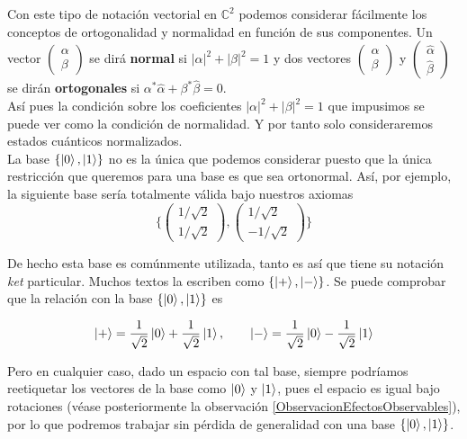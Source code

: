 \documentclass[11pt, spanish]{report}
\numberwithin{equation}{section}
\numberwithin{defin}{section}
\begin{document}
Con este tipo de notación vectorial en $\mathbb{C}^2$ podemos considerar fácilmente los conceptos de ortogonalidad y normalidad en función de sus componentes. Un vector $\begin{pmatrix}\alpha \\ \beta \end{pmatrix}$ se dirá \textbf{normal} si $|\alpha|^2+|\beta|^2=1$ y dos vectores $\begin{pmatrix}\alpha \\ \beta \end{pmatrix}$ y $\begin{pmatrix}\hat{\alpha} \\ \hat{\beta} \end{pmatrix}$ se dirán \textbf{ortogonales} si $\alpha^*\hat{\alpha}+\beta^*\hat{\beta}=0$.\\

Así pues la condición sobre los coeficientes $|\alpha|^2+|\beta|^2=1$ que impusimos se puede ver como la condición de normalidad. Y por tanto solo consideraremos estados cuánticos normalizados.\\

La base $\{\ket{0},\ket{1}\}$ no es la única que podemos considerar puesto que la única restricción que queremos para una base es que sea ortonormal. Así, por ejemplo, la siguiente base sería totalmente válida bajo nuestros axiomas
\begin{equation}
\Bigg\{\begin{pmatrix}1/\sqrt{2} \\ 1/\sqrt{2} \end{pmatrix}, \begin{pmatrix}1/\sqrt{2} \\ -1/\sqrt{2} \end{pmatrix}\Bigg\}
\end{equation}

De hecho esta base es comúnmente utilizada, tanto es así que tiene su notación \textit{ket} particular. Muchos textos la escriben como $\{\ket{+},\ket{-}\}$. Se puede comprobar que la relación con la base $\{\ket{0},\ket{1}\}$ es

\begin{equation}
\ket{+}=\frac{1}{\sqrt{2}}\ket{0}+\frac{1}{\sqrt{2}}\ket{1},\qquad \ket{-}=\frac{1}{\sqrt{2}}\ket{0}-\frac{1}{\sqrt{2}}\ket{1}
\end{equation}

Pero en cualquier caso, dado un espacio con tal base, siempre podríamos reetiquetar los vectores de la base como $\ket{0}$ y $\ket{1}$, pues el espacio es igual bajo rotaciones (véase posteriormente la observación \ref{ObservacionEfectosObservables}), por lo que podremos trabajar sin pérdida de generalidad con una base $\{\ket{0},\ket{1}\}$.\\
\end{document}
